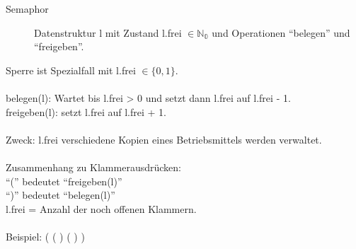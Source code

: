 \begin{description}
\item[Semaphor] Datenstruktur l mit Zustand l.frei $ \in \mathbb{N_0} $ und Operationen "`belegen"' und "`freigeben"'.
\end{description}
Sperre ist Spezialfall mit l.frei $ \in \{0, 1\} $.\\
\\
belegen(l): Wartet bis l.frei > 0 und setzt dann l.frei auf l.frei - 1.\\
freigeben(l): setzt l.frei auf l.frei + 1.\\
\\
Zweck: l.frei verschiedene Kopien eines Betriebsmittels werden verwaltet.\\
\\
Zusammenhang zu Klammerausdrücken:\\
"`("' bedeutet "`freigeben(l)"'\\
"`)"' bedeutet "`belegen(l)"'\\
l.frei = Anzahl der noch offenen Klammern.\\
\\
Beispiel:          ( ( ) ( ) ) %
%


